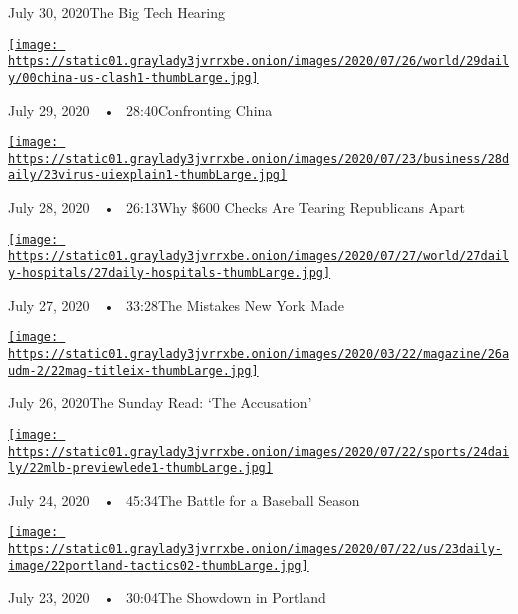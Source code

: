 July 30, 2020The Big Tech Hearing

\href{https://www.nytimes3xbfgragh.onion/2020/07/29/podcasts/the-daily/china-trump-foreign-policy.html?action=click\&module=audio-series-bar\&region=header\&pgtype=Article}{\texttt{[image: https://static01.graylady3jvrrxbe.onion/images/2020/07/26/world/29daily/00china-us-clash1-thumbLarge.jpg]}}

July 29, 2020~~•~ 28:40Confronting China

\href{https://www.nytimes3xbfgragh.onion/2020/07/28/podcasts/the-daily/unemployment-benefits-coronavirus.html?action=click\&module=audio-series-bar\&region=header\&pgtype=Article}{\texttt{[image: https://static01.graylady3jvrrxbe.onion/images/2020/07/23/business/28daily/23virus-uiexplain1-thumbLarge.jpg]}}

July 28, 2020~~•~ 26:13Why \$600 Checks Are Tearing Republicans Apart

\href{https://www.nytimes3xbfgragh.onion/2020/07/27/podcasts/the-daily/new-york-hospitals-covid.html?action=click\&module=audio-series-bar\&region=header\&pgtype=Article}{\texttt{[image: https://static01.graylady3jvrrxbe.onion/images/2020/07/27/world/27daily-hospitals/27daily-hospitals-thumbLarge.jpg]}}

July 27, 2020~~•~ 33:28The Mistakes New York Made

\href{https://www.nytimes3xbfgragh.onion/2020/07/26/podcasts/the-daily/the-accusation-the-sunday-read.html?action=click\&module=audio-series-bar\&region=header\&pgtype=Article}{\texttt{[image: https://static01.graylady3jvrrxbe.onion/images/2020/03/22/magazine/26audm-2/22mag-titleix-thumbLarge.jpg]}}

July 26, 2020The Sunday Read: `The Accusation'

\href{https://www.nytimes3xbfgragh.onion/2020/07/24/podcasts/the-daily/mlb-baseball-season-coronavirus.html?action=click\&module=audio-series-bar\&region=header\&pgtype=Article}{\texttt{[image: https://static01.graylady3jvrrxbe.onion/images/2020/07/22/sports/24daily/22mlb-previewlede1-thumbLarge.jpg]}}

July 24, 2020~~•~ 45:34The Battle for a Baseball Season

\href{https://www.nytimes3xbfgragh.onion/2020/07/23/podcasts/the-daily/portland-protests.html?action=click\&module=audio-series-bar\&region=header\&pgtype=Article}{\texttt{[image: https://static01.graylady3jvrrxbe.onion/images/2020/07/22/us/23daily-image/22portland-tactics02-thumbLarge.jpg]}}

July 23, 2020~~•~ 30:04The Showdown in Portland

